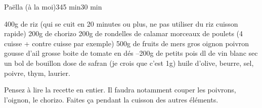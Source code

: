 \begin{recette}{Paëlla (à la moi)}{3}{45 min}{30 min}
\begin{ingredients}
\ingredient 400g de riz (qui se cuit en 20 minutes ou plus, ne pas utiliser du riz cuisson rapide)
\ingredient 200g de chorizo
\ingredient 200g de rondelles de calamar
 morceaux de poulets (4 cuisse + contre cuisse par exemple)
\ingredient 500g de fruits de mers
 gros oignon
 poivron
 gousse d'ail
 grosse boite de tomate en dés
--200g de petits pois
 dl de vin blanc sec
\ingredient un bol de bouillon
 dose de safran (je crois que c'est 1g)
\ingredient huile d'olive, beurre, sel, poivre, thym, laurier.
\end{ingredients}

\begin{preparation*}
Pensez à lire la recette en entier. Il faudra notamment couper les poivrons, l'oignon, le chorizo. Faites ça pendant la cuisson des autres éléments.


\end{preparation*}
\end{recette}
